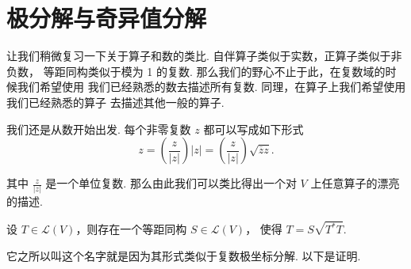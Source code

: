 \chapter{极分解与奇异值分解}

让我们稍微复习一下关于算子和数的类比. 自伴算子类似于实数，正算子类似于非负数，
等距同构类似于模为 1 的复数. 那么我们的野心不止于此，在复数域的时候我们希望使用
我们已经熟悉的数去描述所有复数. 同理，在算子上我们希望使用我们已经熟悉的算子
去描述其他一般的算子. 

我们还是从数开始出发. 每个非零复数 $ z $ 都可以写成如下形式
\[
    z = \left(\frac{z}{\lvert z \rvert}\right)\lvert z \rvert 
    = \left(\frac{z}{\lvert z \rvert}\right)\sqrt{\overline{z}z}.
\]

其中 $ \frac{z}{\lvert z \rvert} $ 是一个单位复数. 
那么由此我们可以类比得出一个对 $ V $ 上任意算子的漂亮的描述. 

\begin{theorem}
     设 $ T \in \mathcal{L}(V) $，则存在一个等距同构 $ S \in \mathcal{L}(V) $，
    使得 $ T = S\sqrt{T^*T} $. 
\end{theorem}

它之所以叫这个名字就是因为其形式类似于复数极坐标分解. 以下是证明. 

